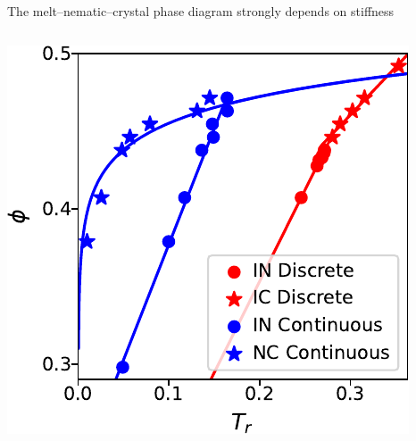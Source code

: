\documentclass[aspectratio=169]{beamer}
\begin{document}
\begin{frame}[c]{The melt--nematic--crystal phase diagram strongly depends on stiffness}
{\begin{columns}[T]
    \includegraphics[scale=1.0]{../figures/ch5_soft/step_vs_harm/fig-phase_diags/fig-phase_diag.pdf}
    
  \end{columns}

  }
\end{frame}
\end{document}
